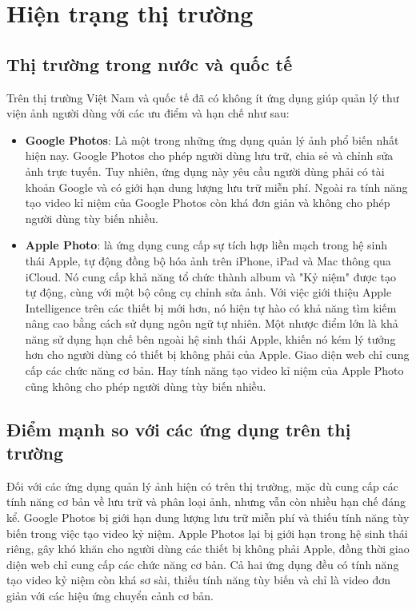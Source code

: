 \section{Hiện trạng thị trường}
\subsection{Thị trường trong nước và quốc tế}
Trên thị trường Việt Nam và quốc tế đã có không ít ứng dụng giúp quản lý thư viện ảnh người dùng với các ưu điểm và hạn chế như sau:
\begin{itemize}
    \item \textbf{Google Photos}: Là một trong những ứng dụng quản lý ảnh phổ biến nhất hiện nay. Google Photos cho phép người dùng lưu trữ, chia sẻ và chỉnh sửa ảnh trực tuyến. Tuy nhiên, ứng dụng này yêu cầu người dùng phải có tài khoản Google và có giới hạn dung lượng lưu trữ miễn phí. Ngoài ra tính năng tạo video kỉ niệm của Google Photos còn khá đơn giản và không cho phép người dùng tùy biến nhiều.
    \item \textbf{Apple Photo}: là ứng dụng cung cấp sự tích hợp liền mạch trong hệ sinh thái Apple, tự động đồng bộ hóa ảnh trên iPhone, iPad và Mac thông qua iCloud. Nó cung cấp khả năng tổ chức thành album và "Kỷ niệm" được tạo tự động, cùng với một bộ công cụ chỉnh sửa ảnh. Với việc giới thiệu Apple Intelligence trên các thiết bị mới hơn, nó hiện tự hào có khả năng tìm kiếm nâng cao bằng cách sử dụng ngôn ngữ tự nhiên. Một nhược điểm lớn là khả năng sử dụng hạn chế bên ngoài hệ sinh thái Apple, khiến nó kém lý tưởng hơn cho người dùng có thiết bị không phải của Apple. Giao diện web chỉ cung cấp các chức năng cơ bản. Hay tính năng tạo video kỉ niệm của Apple Photo cũng không cho phép người dùng tùy biến nhiều.
\end{itemize}

\subsection{Điểm mạnh so với các ứng dụng trên thị trường}
Đối với các ứng dụng quản lý ảnh hiện có trên thị trường, mặc dù cung cấp các tính năng cơ bản về lưu trữ và phân loại ảnh, nhưng vẫn còn nhiều hạn chế đáng kể. Google Photos bị giới hạn dung lượng lưu trữ miễn phí và thiếu tính năng tùy biến trong việc tạo video kỷ niệm. Apple Photos lại bị giới hạn trong hệ sinh thái riêng, gây khó khăn cho người dùng các thiết bị không phải Apple, đồng thời giao diện web chỉ cung cấp các chức năng cơ bản. Cả hai ứng dụng đều có tính năng tạo video kỷ niệm còn khá sơ sài, thiếu tính năng tùy biến và chỉ là video đơn giản với các hiệu ứng chuyển cảnh cơ bản.

